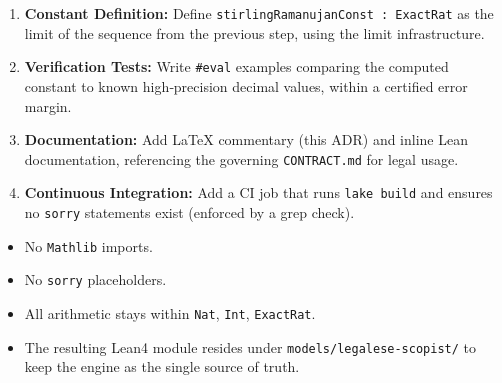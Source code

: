 \begin{description}
\begin{enumerate}
      \item \textbf{Constant Definition:} Define \texttt{stirlingRamanujanConst : ExactRat} as the limit of the sequence from the previous step, using the limit infrastructure.
      \item \textbf{Verification Tests:} Write \texttt{#eval} examples comparing the computed constant to known high‑precision decimal values, within a certified error margin.
      \item \textbf{Documentation:} Add LaTeX commentary (this ADR) and inline Lean documentation, referencing the governing \texttt{CONTRACT.md} for legal usage.
      \item \textbf{Continuous Integration:} Add a CI job that runs \texttt{lake build} and ensures no \texttt{sorry} statements exist (enforced by a grep check).
    \end{enumerate}
  \item[Compliance Checks:]
    \begin{itemize}
      \item No \texttt{Mathlib} imports.
      \item No \texttt{sorry} placeholders.
      \item All arithmetic stays within \texttt{Nat}, \texttt{Int}, \texttt{ExactRat}.
      \item The resulting Lean4 module resides under \texttt{models/legalese-scopist/} to keep the engine as the single source of truth.
    \end{itemize}
\end{description}
